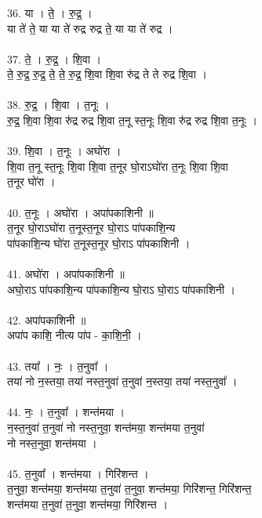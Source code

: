 \subsubsection{}
36. या । ते॒ । रु॒द्र॒ ।\\
या ते॑ ते॒ या या ते॑ रुद्र रुद्र ते॒ या या ते॑ रुद्र ।\\
\\
37. ते॒ । रु॒द्र॒ । शि॒वा ।\\
ते॒ रु॒द्र॒ रु॒द्र॒ ते॒ ते॒ रु॒द्र॒ शि॒वा शि॒वा रु॑द्र ते ते रुद्र शि॒वा ।\\
\\
38. रु॒द्र॒ । शि॒वा । त॒नूः ।\\
रु॒द्र॒ शि॒वा शि॒वा रु॑द्र रुद्र शि॒वा त॒नू स्त॒नूः शि॒वा रु॑द्र रुद्र शि॒वा त॒नूः ।\\
\\
39. शि॒वा । त॒नूः । अघो॑रा ।\\
शि॒वा त॒नू स्त॒नूः शि॒वा शि॒वा त॒नूर घो॒राऽघो॑रा त॒नूः शि॒वा शि॒वा\\
त॒नूर घो॑रा ।\\
\\
40. त॒नूः । अघो॑रा । अपा॑पकाशिनी ॥\\
त॒नूर घो॒राऽघो॑रा त॒नूस्त॒नूर घो॒राऽ पा॑पकाशि॒न्य\\
पा॑पकाशि॒न्य घो॑रा त॒नूस्त॒नूर घो॒राऽ पा॑पकाशिनी ।\\
\\
41. अघो॑रा । अपा॑पकाशिनी ॥\\
अघो॒राऽ पा॑पकाशि॒न्य पा॑पकाशि॒न्य घो॒राऽ घो॒राऽ पा॑पकाशिनी ।\\
\\
42. अपा॑पकाशिनी ॥\\
अपा॑प काशि॒ नीत्य पा॑प - का॒शि॒नी॒ ।\\
\\
43. तया᳚ । नः॒ । त॒नुवा᳚ ।\\
तया॑ नो न॒स्तया॒ तया॑ नस्त॒नुवा॑ त॒नुवा॑ न॒स्तया॒ तया॑ नस्त॒नुवा᳚ ।\\
\\
44. नः॒ । त॒नुवा᳚ । शन्त॑मया ।\\
न॒स्त॒नुवा॑ त॒नुवा॑ नो नस्त॒नुवा॒ शन्त॑मया॒ शन्त॑मया त॒नुवा॑\\
नो नस्त॒नुवा॒ शन्त॑मया ।\\
\\
45. त॒नुवा᳚ । शन्त॑मया । गिरि॑शन्त ।\\
त॒नुवा॒ शन्त॑मया॒ शन्त॑मया त॒नुवा॑ त॒नुवा॒ शन्त॑मया॒ गिरि॑शन्त॒ गिरि॑शन्त॒\\
शन्त॑मया त॒नुवा॑ त॒नुवा॒ शन्त॑मया॒ गिरि॑शन्त ।\\
